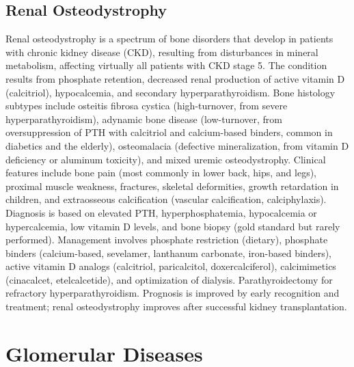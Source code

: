 \subsection{Renal Osteodystrophy}
\label{sec:Renal Osteodystrophy}
Renal osteodystrophy is a spectrum of bone disorders that develop in patients with chronic kidney disease (CKD), resulting from disturbances in mineral metabolism, affecting virtually all patients with CKD stage 5. The condition results from phosphate retention, decreased renal production of active vitamin D (calcitriol), hypocalcemia, and secondary hyperparathyroidism. Bone histology subtypes include osteitis fibrosa cystica (high-turnover, from severe hyperparathyroidism), adynamic bone disease (low-turnover, from oversuppression of PTH with calcitriol and calcium-based binders, common in diabetics and the elderly), osteomalacia (defective mineralization, from vitamin D deficiency or aluminum toxicity), and mixed uremic osteodystrophy. Clinical features include bone pain (most commonly in lower back, hips, and legs), proximal muscle weakness, fractures, skeletal deformities, growth retardation in children, and extraosseous calcification (vascular calcification, calciphylaxis). Diagnosis is based on elevated PTH, hyperphosphatemia, hypocalcemia or hypercalcemia, low vitamin D levels, and bone biopsy (gold standard but rarely performed). Management involves phosphate restriction (dietary), phosphate binders (calcium-based, sevelamer, lanthanum carbonate, iron-based binders), active vitamin D analogs (calcitriol, paricalcitol, doxercalciferol), calcimimetics (cinacalcet, etelcalcetide), and optimization of dialysis. Parathyroidectomy for refractory hyperparathyroidism. Prognosis is improved by early recognition and treatment; renal osteodystrophy improves after successful kidney transplantation.

\section{Glomerular Diseases}





